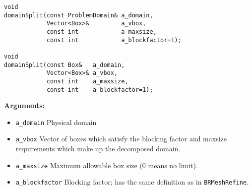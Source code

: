\begin{verbatim}
void
domainSplit(const ProblemDomain& a_domain,
            Vector<Box>&         a_vbox,
            const int            a_maxsize,
            const int            a_blockfactor=1);

void
domainSplit(const Box&   a_domain,
            Vector<Box>& a_vbox,
            const int    a_maxsize,
            const int    a_blockfactor=1);
\end{verbatim} 

{\bf {Arguments:}}

\begin{itemize}
\item \verb/a_domain/  Physical domain
\item \verb/a_vbox/ Vector of boxes which satisfy the blocking factor
and maxsize requirements which make up the decomposed domain.
\item \verb/a_maxsize/ Maximum allowable box size (0 means no limit).
\item \verb/a_blockfactor/ Blocking factor; has the same definition as
in {\tt BRMeshRefine}.

\end{itemize}



